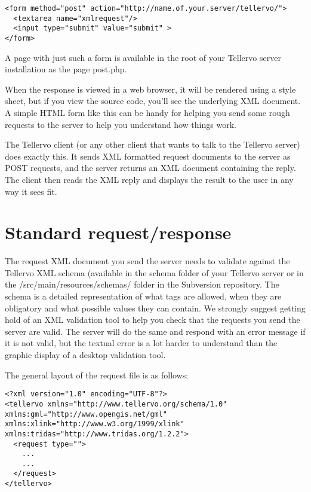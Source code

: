 \begin{lstlisting}
<form method="post" action="http://name.of.your.server/tellervo/">
  <textarea name="xmlrequest"/>
  <input type="submit" value="submit" >
</form>
\end{lstlisting}

A page with just such a form is available in the root of your Tellervo server installation as the page post.php.

When the response is viewed in a web browser, it will be rendered using a style sheet, but if you view the source code, you'll see the underlying XML document.  A simple HTML form like this can be handy for helping you send some rough requests to the server to help you understand how things work.

The Tellervo client (or any other client that wants to talk to the Tellervo server) does exactly this.  It sends XML formatted request documents to the server as POST requests, and the server returns an XML document containing the reply.  The client then reads the XML reply and displays the result to the user in any way it sees fit.


\section{Standard request/response}

The request XML document you send the server needs to validate against the Tellervo XML schema (available in the schema folder of your Tellervo server or in the /src/main/resources/schemas/ folder in the Subversion repository.  The schema is a detailed representation of what tags are allowed, when they are obligatory and what possible values they can contain.  We strongly suggest getting hold of an XML validation tool to help you check that the requests you send the server are valid.  The server will do the same and respond with an error message if it is not valid, but the textual error is a lot harder to understand than the graphic display of a desktop validation tool.

The general layout of the request file is as follows:

\begin{lstlisting}
<?xml version="1.0" encoding="UTF-8"?>
<tellervo xmlns="http://www.tellervo.org/schema/1.0" xmlns:gml="http://www.opengis.net/gml" xmlns:xlink="http://www.w3.org/1999/xlink" xmlns:tridas="http://www.tridas.org/1.2.2">
  <request type="">
    ...
    ...
  </request>
</tellervo>
\end{lstlisting}


